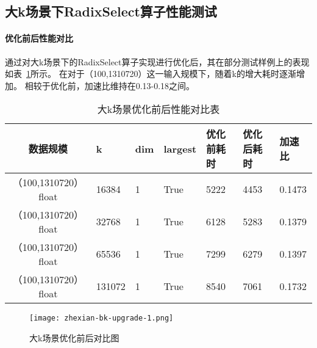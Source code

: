 


\subsection{大k场景下RadixSelect算子性能测试}

\paragraph{优化前后性能对比}
通过对大k场景下的RadixSelect算子实现进行优化后，其在部分测试样例上的表现如表~\ref{tab:bench_bigk_upgrade}所示。
在对于（100,1310720）这一输入规模下，随着k的增大耗时逐渐增加。
相较于优化前，加速比维持在0.13-0.18之间。
\begin{table}[ht]
    \centering
    \caption{大k场景优化前后性能对比表}
    \label{tab:bench_bigk_upgrade}
    \begin{tabular}{cllllll}
        \toprule
        数据规模       &k  & dim  & largest & 优化前耗时    & 优化后耗时 &加速比\\
        \midrule
        （100,1310720） float&16384&  1     & True      & 5222 & 4453 & 0.1473\\
        （100,1310720） float&32768&  1     & True      & 6128 & 5283 & 0.1379\\
        （100,1310720） float&65536&  1     & True      & 7299 & 6279 & 0.1397\\
        （100,1310720） float&131072&  1     & True      & 8540 & 7061 & 0.1732\\
        
        
        \bottomrule
    \end{tabular}
    \end{table}
    
    
    \begin{figure}
        \centering
        \texttt{[image: zhexian-bk-upgrade-1.png]}
        \caption{大k场景优化前后对比图}
        \label{fig:bench_bk_upgrade_zhexian}
    \end{figure}
    



